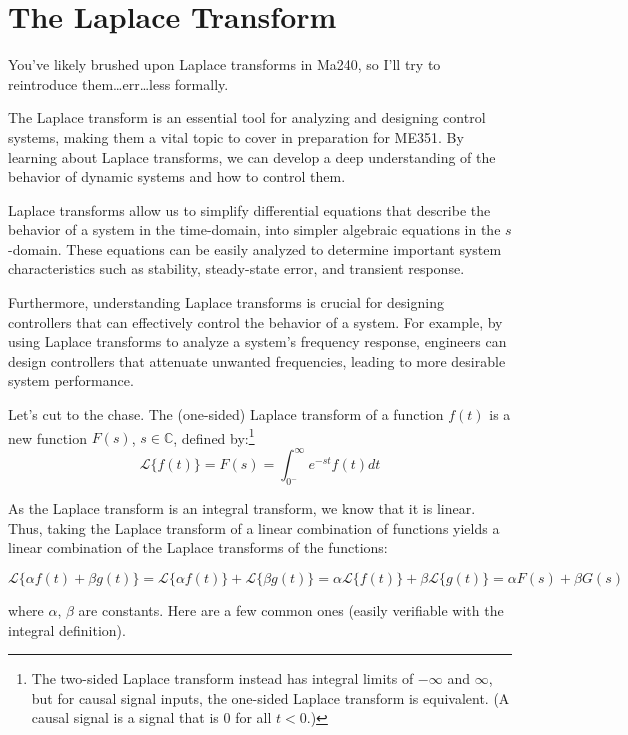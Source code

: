 \documentclass[
  letterpaper,
  DIV=11,
  numbers=noendperiod]{scrreprt}
\begin{document}
\hypertarget{the-laplace-transform}{%
\section{The Laplace Transform}\label{the-laplace-transform}}

You've likely brushed upon Laplace transforms in Ma240, so I'll try to
reintroduce them\ldots err\ldots less formally.

The Laplace transform is an essential tool for analyzing and designing
control systems, making them a vital topic to cover in preparation for
ME351. By learning about Laplace transforms, we can develop a deep
understanding of the behavior of dynamic systems and how to control
them.

Laplace transforms allow us to simplify differential equations that
describe the behavior of a system in the time-domain, into simpler
algebraic equations in the \(s\)-domain. These equations can be easily
analyzed to determine important system characteristics such as
stability, steady-state error, and transient response.

Furthermore, understanding Laplace transforms is crucial for designing
controllers that can effectively control the behavior of a system. For
example, by using Laplace transforms to analyze a system's frequency
response, engineers can design controllers that attenuate unwanted
frequencies, leading to more desirable system performance.

Let's cut to the chase. The (one-sided) Laplace transform of a function
\(f(t)\) is a new function \(F(s)\), \(s \in \mathbb{C}\), defined
by:\footnote{The two-sided Laplace transform instead has integral limits
  of \(-\infty\) and \(\infty\), but for causal signal inputs, the
  one-sided Laplace transform is equivalent. (A causal signal is a
  signal that is 0 for all \(t<0\).)}
\[ \mathcal{L} \{ f(t) \} = F(s) = \int_{0^-} ^\infty e^{-st} f(t) dt \]

As the Laplace transform is an integral transform, we know that it is
linear. Thus, taking the Laplace transform of a linear combination of
functions yields a linear combination of the Laplace transforms of the
functions:

\[\mathcal{L} \{ \alpha f(t) + \beta g(t) \} = \mathcal{L} \{ \alpha f(t) \} + \mathcal{L} \{ \beta g(t) \} = \alpha \mathcal{L} \{ f(t) \} + \beta \mathcal{L} \{ g(t) \} = \alpha F(s) + \beta G(s)\]

where \(\alpha, \,\beta\) are constants. Here are a few common ones
(easily verifiable with the integral definition).
\end{document}
